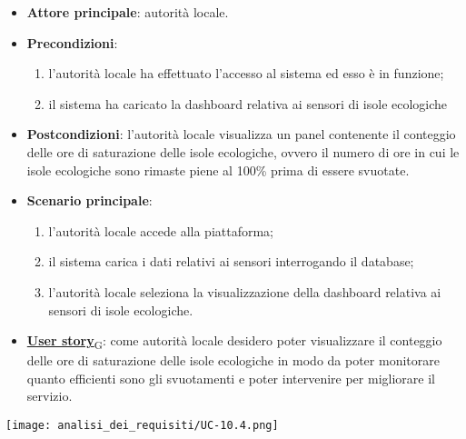 \begin{itemize}
	\item \textbf{Attore principale}: autorità locale.
	\item \textbf{Precondizioni}:
	      \begin{enumerate}
		      \item l'autorità locale ha effettuato l'accesso al sistema ed esso è in funzione;
		      \item il sistema ha caricato la dashboard relativa ai sensori di isole ecologiche
	      \end{enumerate}
	\item \textbf{Postcondizioni}: l'autorità locale visualizza un panel contenente il conteggio delle ore di saturazione delle isole ecologiche,
	      ovvero il numero di ore in cui le isole ecologiche sono rimaste piene al 100\% prima di essere svuotate.
	\item \textbf{Scenario principale}:
	      \begin{enumerate}
		      \item l'autorità locale accede alla piattaforma;
		      \item il sistema carica i dati relativi ai sensori interrogando il database;
		      \item l'autorità locale seleziona la visualizzazione della dashboard relativa ai sensori di isole ecologiche.
	      \end{enumerate}
	\item \href{https://7last.github.io/docs/rtb/documentazione-interna/glossario\#user-story}{\textbf{User story}\textsubscript{G}}:
	      come autorità locale desidero poter visualizzare il conteggio delle ore di saturazione delle isole ecologiche in modo da poter monitorare
	      quanto efficienti sono gli svuotamenti e poter intervenire per migliorare il servizio.
\end{itemize}
\begin{center}
	\texttt{[image: analisi\_dei\_requisiti/UC-10.4.png]}
\end{center}


